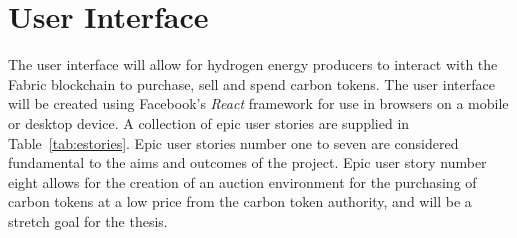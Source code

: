 \section{User Interface}
The user interface will allow for hydrogen energy producers
to interact with the Fabric blockchain to
purchase, sell and spend carbon tokens. The
user interface will be created using Facebook's
\textit{React} framework for use in browsers on a
mobile or desktop device. A collection of epic
user stories are supplied in Table~\ref{tab:estories}.
Epic user stories number one to seven are considered
fundamental to the aims and outcomes of the project.
Epic user story number eight allows for the creation of
an auction environment for the purchasing of carbon
tokens at a low price from the carbon token authority,
and will be a stretch goal for the thesis.

